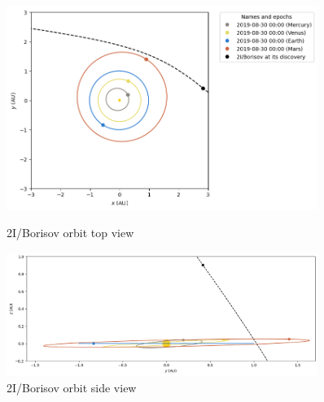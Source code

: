 \documentclass[xcolor={dvipsnames}]{beamer}
\begin{document}
\begin{frame}
\begin{figure}
    \centering
    \begin{minipage}{0.45\textwidth}
        \centering
        \includegraphics[width=0.9\textwidth]{fig/static/borisov/orbit_xy.png}
        \caption{2I/Borisov orbit top view}
        \label{fig:figure1}
    \end{minipage}
    \hfill
    \begin{minipage}{0.45\textwidth}
        \centering
        \includegraphics[width=0.9\textwidth]{fig/static/borisov/orbit_yz.png}
        \caption{2I/Borisov orbit side view}
        \label{fig:figure2}
    \end{minipage}
\end{figure}

\end{frame}
\end{document}
